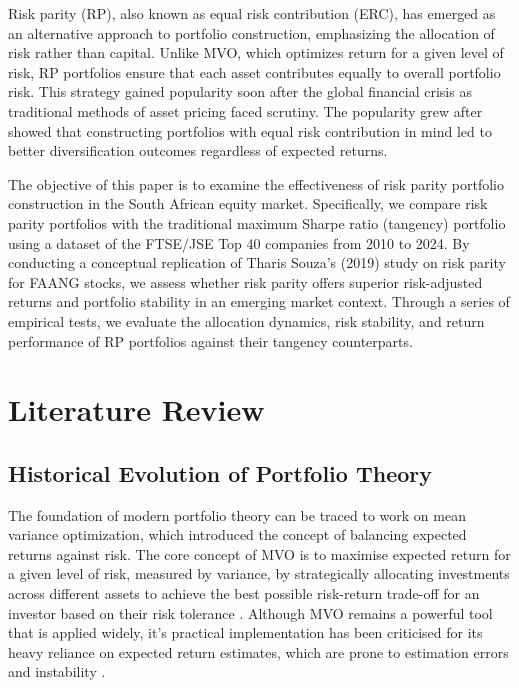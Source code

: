 \documentclass[preprint, 3p,
authoryear]{elsarticle} %
\begin{document}
Risk parity (RP), also known as equal risk contribution (ERC), has
emerged as an alternative approach to portfolio construction,
emphasizing the allocation of risk rather than capital. Unlike MVO,
which optimizes return for a given level of risk, RP portfolios ensure
that each asset contributes equally to overall portfolio risk. This
strategy gained popularity soon after the global financial crisis as
traditional methods of asset pricing faced scrutiny. The popularity grew
after \citet{maillard2010} showed that constructing portfolios with
equal risk contribution in mind led to better diversification outcomes
regardless of expected returns.

The objective of this paper is to examine the effectiveness of risk
parity portfolio construction in the South African equity market.
Specifically, we compare risk parity portfolios with the traditional
maximum Sharpe ratio (tangency) portfolio using a dataset of the
FTSE/JSE Top 40 companies from 2010 to 2024. By conducting a conceptual
replication of Tharis Souza's (2019) study on risk parity for FAANG
stocks, we assess whether risk parity offers superior risk-adjusted
returns and portfolio stability in an emerging market context. Through a
series of empirical tests, we evaluate the allocation dynamics, risk
stability, and return performance of RP portfolios against their
tangency counterparts.

\hypertarget{literature-review}{%
\section{Literature Review}\label{literature-review}}

\hypertarget{historical-evolution-of-portfolio-theory}{%
\subsection{Historical Evolution of Portfolio
Theory}\label{historical-evolution-of-portfolio-theory}}

The foundation of modern portfolio theory can be traced to
\citet{HM1952} work on mean variance optimization, which introduced the
concept of balancing expected returns against risk. The core concept of
MVO is to maximise expected return for a given level of risk, measured
by variance, by strategically allocating investments across different
assets to achieve the best possible risk-return trade-off for an
investor based on their risk tolerance \citep{panulo2014}. Although MVO
remains a powerful tool that is applied widely, it's practical
implementation has been criticised for its heavy reliance on expected
return estimates, which are prone to estimation errors and instability
\citep{best1991}.
\end{document}
